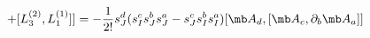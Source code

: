 \begin{equation}
[L_3^{(1)},[L_3^{(1)},L_1^{(2)}]+[L_3^{(2)},L_1^{(1)}]]=- \frac{1}{2!}s_{J}^{d} ( s_{I}^{c}  s_{J}^{b}s_{J}^{a}- s_{J}^{c}  s_{I}^{b}s_{I}^{a})[{\mb A}_d,[{\mb A}_c,\partial_b {\mb A}_a]]
\end{equation}

